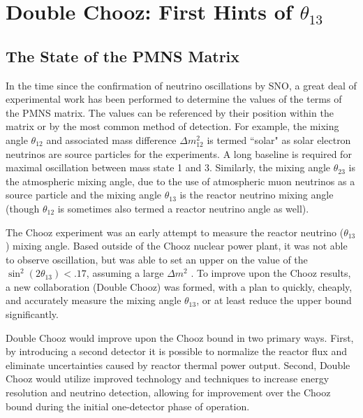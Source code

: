 \chapter{Double Chooz: First Hints of $\theta_{13}$}
\label{chap:Double Chooz}
\section{The State of the PMNS Matrix}
In the time since the confirmation of neutrino oscillations by SNO, a great deal of experimental work has been performed to determine the values of the terms of the PMNS matrix. The values can be referenced by their position within the matrix or by the most common method of detection. For example, the mixing angle $\theta_{12}$ and associated mass difference $\Delta m_{12}^2$ is termed ``solar"  as solar electron neutrinos are source particles for the experiments. A long baseline is required for maximal oscillation between mass state 1 and 3. Similarly, the mixing angle  $\theta_{23}$ is the atmospheric mixing angle, due to the use of atmospheric muon neutrinos as a source particle and the mixing angle $\theta_{13}$ is the reactor neutrino mixing angle (though $\theta_{12}$ is sometimes also termed a reactor neutrino angle as well). 

The Chooz experiment was an early attempt to measure the reactor neutrino ($\theta_{13}$) mixing angle. Based outside of the Chooz nuclear power plant, it was not able to observe oscillation, but was able to set an upper on the value of the $\sin^2(2\theta_{13}) < .17$, assuming a large $\Delta m^2$ \cite{Chooz}. To improve upon the Chooz results, a new collaboration (Double Chooz) was formed, with a plan to quickly, cheaply, and accurately measure the mixing angle $\theta_{13}$, or at least reduce the upper bound significantly. 

Double Chooz would improve upon the Chooz bound in two primary ways. First, by introducing a second detector it is possible to normalize the reactor flux and eliminate uncertainties caused by reactor thermal power output. Second, Double Chooz would utilize improved technology and techniques to increase energy resolution and neutrino detection, allowing for improvement over the Chooz bound during the initial one-detector phase of operation.

